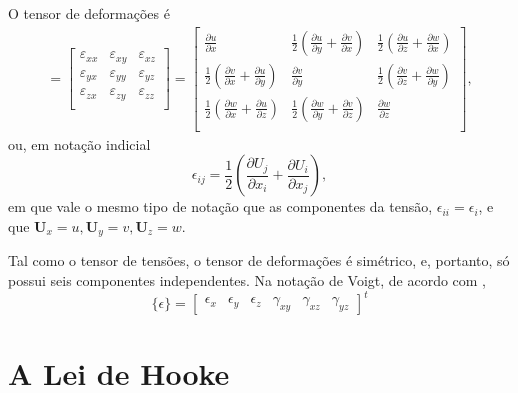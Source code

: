 O tensor de deformações é
\begin{gather}
    [\mathbf{\epsilon}] = 
    \begin{bmatrix}
        \varepsilon_{xx} & \varepsilon_{xy} & \varepsilon_{xz} \\
        \varepsilon_{yx} & \varepsilon_{yy} & \varepsilon_{yz} \\
        \varepsilon_{zx} & \varepsilon_{zy} & \varepsilon_{zz} \\
    \end{bmatrix}
        =
    \begin{bmatrix}
        \frac{\partial u}{\partial x} & \frac{1}{2} \left(\frac{\partial u}{\partial y}+\frac{\partial v}{\partial x}\right) & \frac{1}{2} \left(\frac{\partial u}{\partial z}+\frac{\partial w}{\partial x}\right) \\
        \frac{1}{2} \left(\frac{\partial v}{\partial x}+\frac{\partial u}{\partial y}\right) & \frac{\partial v}{\partial y} & \frac{1}{2} \left(\frac{\partial v}{\partial z}+\frac{\partial w}{\partial y}\right) \\
        \frac{1}{2} \left(\frac{\partial w}{\partial x}+\frac{\partial u}{\partial z}\right) & \frac{1}{2} \left(\frac{\partial w}{\partial y}+\frac{\partial v}{\partial z}\right) & \frac{\partial w}{\partial z} \\
    \end{bmatrix},
    \label{eq:tensor_de_deformacoes}
\end{gather}
ou, em notação indicial
\begin{equation}
    \epsilon_{ij} = \frac{1}{2} \left(\frac{\partial U_j}{\partial x_i} + \frac{\partial U_i}{\partial x_j}\right),
\end{equation}
em que vale o mesmo tipo de notação que as componentes da tensão, $\epsilon_{ii} = \epsilon_i$, e que $\bm{U}_x = u, \bm{U}_y = v, \bm{U}_z = w$.

Tal como o tensor de tensões, o tensor de deformações é simétrico, e, portanto, só possui seis componentes independentes. Na notação de Voigt, de acordo com ,
\begin{equation}
    \{\epsilon\} = \begin{bmatrix}
        \epsilon_x & \epsilon_y & \epsilon_z & \gamma_{xy} & \gamma_{xz} & \gamma_{yz}
    \end{bmatrix}^t
\end{equation}

\section{A Lei de Hooke}

